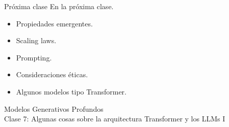 \documentclass{beamer}
\begin{document}
\begin{frame}{Próxima clase}
    En la próxima clase.
    \begin{itemize}
        \item<1> Propiedades emergentes.
        \item<2> Scaling laws.
        \item<3> Prompting.
        \item<4> Consideraciones éticas.
        \item<5> Algunos modelos tipo Transformer.
    \end{itemize}
\end{frame}

\begin{frame}
    \centering
    \Large{Modelos Generativos Profundos}\\
    \large{Clase 7: Algunas cosas sobre la arquitectura Transformer y los LLMs I}
\end{frame}
\end{document}
